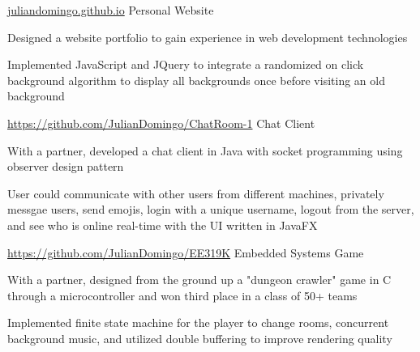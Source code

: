 \begin{cventries}
  \cventry
    {\normalsize \url{juliandomingo.github.io}}
    {\large Personal Website}
    {}
    {}
    {
      \begin{cvitems}
        \item {\normalsize Designed a website portfolio to gain experience in web development technologies}
        \item {\normalsize Implemented JavaScript and JQuery to integrate a randomized on click background algorithm to display all backgrounds once before visiting an old background}
      \end{cvitems}
    }
  \cventry
    {\normalsize \url{https://github.com/JulianDomingo/ChatRoom-1}}
    {\large Chat Client}
    {}
    {}
    {
      \begin{cvitems}
        \item {\normalsize With a partner, developed a chat client in Java with socket programming using observer design pattern}
        \item {\normalsize User could communicate with other users from different machines, privately messgae users, send emojis, login with a unique username, logout from the server, and see who is online real-time with the UI written in JavaFX}
      \end{cvitems}
    }
  \cventry
    {\normalsize \url{https://github.com/JulianDomingo/EE319K}}
    {\large Embedded Systems Game}
    {}
    {}
    {
      \begin{cvitems}
        \item {\normalsize With a partner, designed from the ground up a "dungeon crawler" game in C through a microcontroller and won third place in a class of 50+ teams}
        \item {\normalsize Implemented finite state machine for the player to change rooms, concurrent background music, and utilized double buffering to improve rendering quality}
      \end{cvitems}
    }
\end{cventries}
